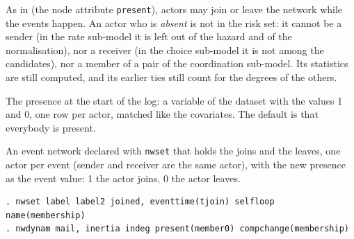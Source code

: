 As in \goldfish{} (the node attribute \texttt{present}), actors may join or leave the network while the events happen. An actor who is \emph{absent} is not in the risk set: it cannot be a sender (in the rate sub-model it is left out of the hazard and of the normalisation), nor a receiver (in the choice sub-model it is not among the candidates), nor a member of a pair of the coordination sub-model. Its statistics are still computed, and its earlier ties still count for the degrees of the others.
\begin{description}[style=nextline,nosep]
  \item[\opt{present(var)}] The presence at the start of the log: a variable of the dataset with the values 1 and 0, one row per actor, matched like the covariates. The default is that everybody is present.
  \item[\opt{compchange(net)}] An event network declared with \texttt{nwset} that holds the joins and the leaves, one actor per event (sender and receiver are the same actor), with the new presence as the event value: 1 the actor joins, 0 the actor leaves.
\end{description}
\begin{lstlisting}
. nwset label label2 joined, eventtime(tjoin) selfloop name(membership)
. nwdynam mail, inertia indeg present(member0) compchange(membership)
\end{lstlisting}
